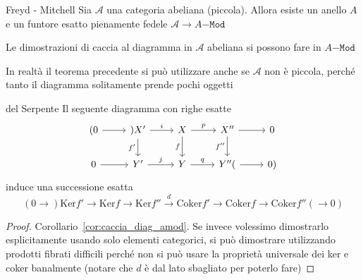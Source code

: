 \begin{theorem}{Freyd - Mitchell}\label{thm:freyd-mitchell}
    Sia \(\mathcal{A}\) una categoria abeliana (piccola). Allora esiste un
    anello \(A\) e un funtore esatto pienamente fedele \(\mathcal{A} \to A\mathtt{-Mod}\) 
\end{theorem}
\begin{corollary}{}\label{cor:caccia_diag_amod}
    Le dimostrazioni di caccia al diagramma in \(\mathcal{A}\) abeliana si
    possono fare in \(A\mathtt{-Mod}\)
\end{corollary}
In realtà il teorema precedente si può utilizzare anche se \(\mathcal{A}\) non è
piccola, perché tanto il diagramma solitamente prende pochi oggetti

\begin{lemmao}{del Serpente}
    Il seguente diagramma con righe esatte
\[\begin{tikzcd}
	{(0} & {)X'} & X & {X''} & 0 \\
	0 & {Y'} & Y & {Y''(} & {0)}
	\arrow[from=1-1, to=1-2]
	\arrow["i", from=1-2, to=1-3]
	\arrow["{f'}"', from=1-2, to=2-2]
	\arrow["p", from=1-3, to=1-4]
	\arrow["f"', from=1-3, to=2-3]
	\arrow[from=1-4, to=1-5]
	\arrow["{f''}"', from=1-4, to=2-4]
	\arrow[from=2-1, to=2-2]
	\arrow["j", from=2-2, to=2-3]
	\arrow["q", from=2-3, to=2-4]
	\arrow[from=2-4, to=2-5]
\end{tikzcd}\]
    induce una successione esatta
    \[
        (0\to ) \mathrm{Ker}f' \to \mathrm{Ker}f \to \mathrm{Ker}f'' \overset{d}{\to} \mathrm{Coker}f' \to \mathrm{Coker}f \to \mathrm{Coker}f'' (\to 0)
    \]
\end{lemmao}
\begin{proof}{}
    Corollario~\ref{cor:caccia_diag_amod}. Se invece volessimo dimostrarlo
    esplicitamente usando solo elementi categorici, si può dimostrare
    utilizzando prodotti fibrati difficili perché non si può usare la proprietà
    universale dei ker e coker banalmente (notare che \(d\) è dal lato sbagliato
    per poterlo fare)
\end{proof}

